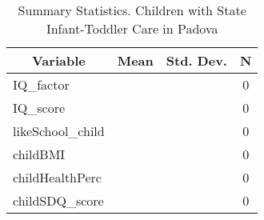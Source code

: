 
\begin{table}[htbp]\centering \caption{Summary Statistics. Children with State Infant-Toddler Care in Padova \label{bothChildasiloStatPadova}}
\begin{tabular}{l c c  c}\hline\hline
\multicolumn{1}{c}{\textbf{Variable}} & \textbf{Mean}
 & \textbf{Std. Dev.} & \textbf{N}\\ \hline
IQ\_factor &  &   & 0\\
IQ\_score &  &   & 0\\
likeSchool\_child &  &   & 0\\
childBMI &  &   & 0\\
childHealthPerc &  &   & 0\\
childSDQ\_score &  &   & 0\\
\hline\end{tabular}
\end{table}

